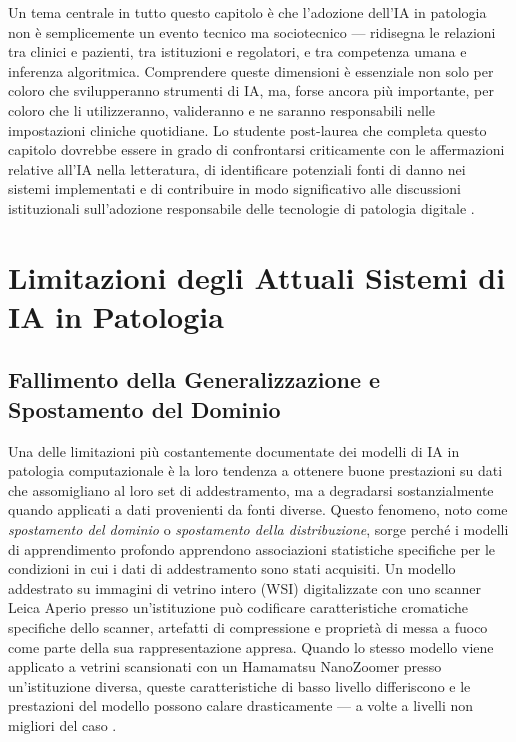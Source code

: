 Un tema centrale in tutto questo capitolo è che l'adozione dell'IA in patologia non è semplicemente un evento tecnico ma sociotecnico — ridisegna le relazioni tra clinici e pazienti, tra istituzioni e regolatori, e tra competenza umana e inferenza algoritmica. Comprendere queste dimensioni è essenziale non solo per coloro che svilupperanno strumenti di IA, ma, forse ancora più importante, per coloro che li utilizzeranno, valideranno e ne saranno responsabili nelle impostazioni cliniche quotidiane. Lo studente post-laurea che completa questo capitolo dovrebbe essere in grado di confrontarsi criticamente con le affermazioni relative all'IA nella letteratura, di identificare potenziali fonti di danno nei sistemi implementati e di contribuire in modo significativo alle discussioni istituzionali sull'adozione responsabile delle tecnologie di patologia digitale \cite{hanna2024}.

\section{Limitazioni degli Attuali Sistemi di IA in Patologia}
\label{sec:ch5_limitations}

\subsection{Fallimento della Generalizzazione e Spostamento del Dominio}

Una delle limitazioni più costantemente documentate dei modelli di IA in patologia computazionale è la loro tendenza a ottenere buone prestazioni su dati che assomigliano al loro set di addestramento, ma a degradarsi sostanzialmente quando applicati a dati provenienti da fonti diverse. Questo fenomeno, noto come \emph{spostamento del dominio} o \emph{spostamento della distribuzione}, sorge perché i modelli di apprendimento profondo apprendono associazioni statistiche specifiche per le condizioni in cui i dati di addestramento sono stati acquisiti. Un modello addestrato su immagini di vetrino intero (WSI) digitalizzate con uno scanner Leica Aperio presso un'istituzione può codificare caratteristiche cromatiche specifiche dello scanner, artefatti di compressione e proprietà di messa a fuoco come parte della sua rappresentazione appresa. Quando lo stesso modello viene applicato a vetrini scansionati con un Hamamatsu NanoZoomer presso un'istituzione diversa, queste caratteristiche di basso livello differiscono e le prestazioni del modello possono calare drasticamente — a volte a livelli non migliori del caso \cite{bankhead2022}.

